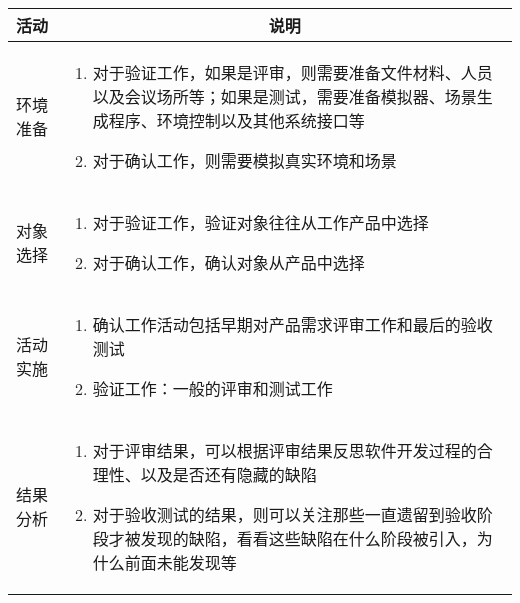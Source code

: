 \vspace{-0.5em}
\begin{spacing}{1.2}
    \centering
    \begin{longtable}{|m{1.5cm}<{\centering}|m{13.8cm}|}
        \hline
        \textbf{活动} & \multicolumn{1}{c|}{\textbf{说明}} \\ \hline
        环境准备 & 
        \vspace{-1.1em}
        \begin{enumerate}[label=,leftmargin=0em]
            \item 对于验证工作，如果是评审，则需要准备文件材料、人员以及会议场所等；如果是测试，需要准备模拟器、场景生成程序、环境控制以及其他系统接口等
            \item 对于确认工作，则需要模拟真实环境和场景
        \vspace{-1.3em}
        \end{enumerate}
        \\ \hline
        对象选择 & 
        \vspace{-1.1em}
        \begin{enumerate}[label=,leftmargin=0em]
            \item 对于验证工作，验证对象往往从工作产品中选择
            \item 对于确认工作，确认对象从产品中选择
        \vspace{-1.3em}
        \end{enumerate}
        \\ \hline
        活动实施 & 
        \vspace{-1.1em}
        \begin{enumerate}[label=,leftmargin=0em]
            \item 确认工作活动包括早期对产品需求评审工作和最后的验收测试
            \item 验证工作：一般的评审和测试工作
        \vspace{-1.3em}
        \end{enumerate}
        \\ \hline
        结果分析 &
        \vspace{-1.1em}
        \begin{enumerate}[label=,leftmargin=0em]
            \item 对于评审结果，可以根据评审结果反思软件开发过程的合理性、以及是否还有隐藏的缺陷
            \item 对于验收测试的结果，则可以关注那些一直遗留到验收阶段才被发现的缺陷，看看这些缺陷在什么阶段被引入，为什么前面未能发现等
        \vspace{-1.3em}
        \end{enumerate} 
        \\ \hline
    \end{longtable}
\end{spacing}
\vspace{-1em}
